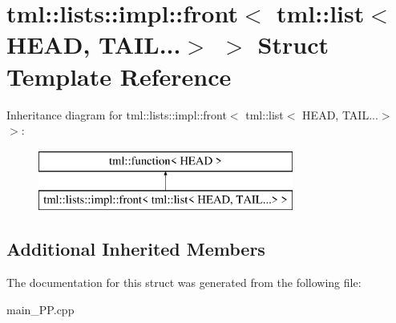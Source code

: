 \hypertarget{structtml_1_1lists_1_1impl_1_1front_3_01tml_1_1list_3_01HEAD_00_01TAIL_8_8_8_4_01_4}{\section{tml\+:\+:lists\+:\+:impl\+:\+:front$<$ tml\+:\+:list$<$ H\+E\+A\+D, T\+A\+I\+L...$>$ $>$ Struct Template Reference}
\label{structtml_1_1lists_1_1impl_1_1front_3_01tml_1_1list_3_01HEAD_00_01TAIL_8_8_8_4_01_4}
}
Inheritance diagram for tml\+:\+:lists\+:\+:impl\+:\+:front$<$ tml\+:\+:list$<$ H\+E\+A\+D, T\+A\+I\+L...$>$ $>$\+:\begin{figure}[H]
\begin{center}
\leavevmode
\includegraphics[height=2.000000cm]{structtml_1_1lists_1_1impl_1_1front_3_01tml_1_1list_3_01HEAD_00_01TAIL_8_8_8_4_01_4}
\end{center}
\end{figure}
\subsection*{Additional Inherited Members}


The documentation for this struct was generated from the following file\+:\begin{DoxyCompactItemize}
\item 
main\+\_\+\+P\+P.\+cpp\end{DoxyCompactItemize}
